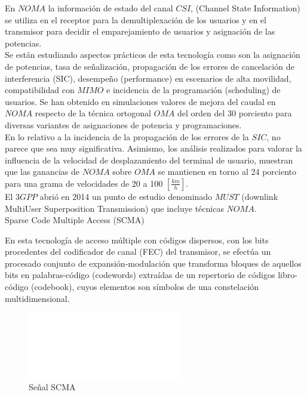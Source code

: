\documentclass[]{article}
\begin{document}
En $NOMA$ la información de estado del canal $CSI$, (Channel State Information) se utiliza en el receptor para la demultiplexación de los usuarios y en el transmisor para decidir el emparejamiento de usuarios y asignación de las potencias.\\

Se están estudiando aspectos prácticos de esta tecnología como son la asignación de potencias, tasa de señalización, propagación de los errores de cancelación de interferencia (SIC), desempeño (performance) en escenarios de alta movilidad, compatibilidad con $MIMO$ e incidencia de la programación (scheduling) de usuarios. Se han obtenido en simulaciones valores de mejora del caudal en $NOMA$ respecto de la técnica ortogonal $OMA$ del orden del 30 porciento para diversas variantes de asignaciones de potencia y programaciones.\\
 
En lo relativo a la incidencia de la propagación de los errores de la $SIC$, no parece que sea muy significativa. Asimismo, los análisis realizados para valorar la influencia de la velocidad de desplazamiento del terminal de usuario, muestran que las ganancias de $NOMA$ sobre $OMA$ se mantienen en torno al 24 porciento para una grama de velocidades de 20 a 100 $[\frac{km}{h}]$.\\
 
El $3GPP$ abrió en 2014 un punto de estudio denominado $MUST$ (downlink MultiUser Superposition Transmission) que incluye técnicas $NOMA$.\\

Sparse Code Multiple Access (SCMA)

En esta tecnología de acceso múltiple con códigos dispersos, con los bits procedentes del codificador de canal (FEC) del transmisor, se efectúa un procesado conjunto de expansión-modulación que transforma bloques de aquellos bits en palabras-código (codewords) extraídas de un repertorio de códigos libro-código (codebook), cuyos elementos son símbolos de una constelación multidimensional.\\

\begin{figure}[h!]
	\centering
	\includegraphics[width=0.6\textwidth]{Imagenes/SCMA.png}
	\caption{Señal SCMA}
	\label{fig:SCMA}
\end{figure}
\end{document}
